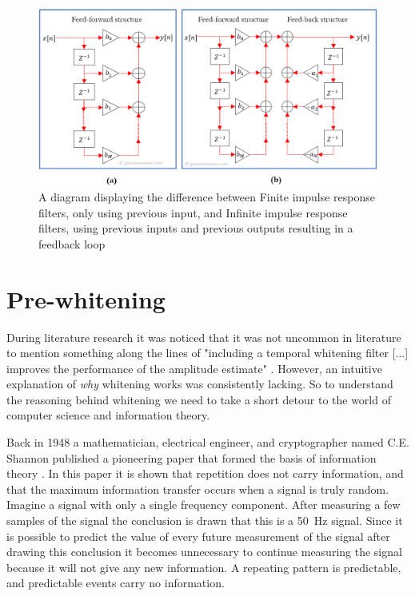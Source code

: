\begin{figure}[h!t]
	\begin{center}
		\includegraphics[width=1.0\columnwidth]{images/fir_vs_iir_diagram.png}
	\end{center}
	\caption{A diagram displaying the difference between Finite impulse response filters, only using previous input, and Infinite impulse response filters, using previous inputs and previous outputs resulting in a feedback loop \cite{fir_vs_iir_diagram}}
	\label{fig:fir_vs_iir_diagram}
\end{figure}


\section{Pre-whitening}
During literature research it was noticed that it was not uncommon in literature to mention something along the lines of "including a temporal whitening filter [...] improves the performance of the amplitude estimate" \cite{single_site_emg_amplitude_estimation,adaptive_whitening,emg_whitening}. However, an intuitive explanation of \textit{why} whitening works was consistently lacking. So to understand the reasoning behind whitening we need to take a short detour to the world of computer science and information theory.

Back in 1948 a mathematician, electrical engineer, and cryptographer named C.E. Shannon published a pioneering paper that formed the basis of information theory \cite{shannon}. In this paper it is shown that repetition does not carry information, and that the maximum information transfer occurs when a signal is truly random. Imagine a signal with only a single frequency component. After measuring a few samples of the signal the conclusion is drawn that this is a \SI{50}{\hertz} signal. Since it is possible to predict the value of every future measurement of the signal after drawing this conclusion it becomes unnecessary to continue measuring the signal because it will not give any new information. A repeating pattern is predictable, and predictable events carry no information.

